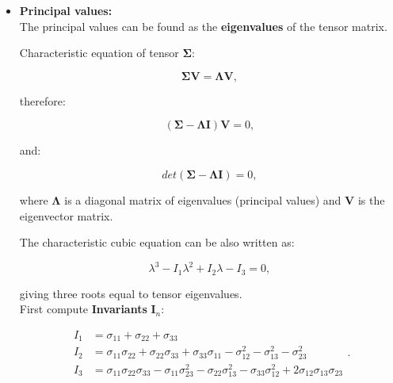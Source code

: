 \documentclass[10pt,b5paper,titlepage]{book}
\begin{document}
\begin{itemize}
    \item \textbf{Principal values:} \\

        The principal values can be found as the \textbf{eigenvalues} of the tensor
        matrix.

        Characteristic equation of tensor $\mathbf{\Sigma}$:

        \begin{equation}
            \mathbf{\Sigma}\mathbf{V} = \mathbf{\Lambda} \mathbf{V}
        ,\end{equation}

        therefore:

        \begin{equation}
            (\mathbf{\Sigma} - \mathbf{\Lambda}\mathbf{I})\mathbf{V} = 0
        ,\end{equation}

        and:

        \begin{equation}
            det(\mathbf{\Sigma} - \mathbf{\Lambda}\mathbf{I}) = 0
        ,\end{equation}

        where $\mathbf{\Lambda}$ is a diagonal matrix of eigenvalues (principal values)
        and $\mathbf{V}$ is the eigenvector matrix.

        The characteristic cubic equation can be also written as:

        \begin{equation}
            \lambda^{3} - I_{1}\lambda^{2} + I_{2}\lambda - I_{3} = 0
        ,\end{equation}

        giving three roots equal to tensor eigenvalues.\\

        First compute \textbf{Invariants} $\mathbf{I}_{n}$:

        \begin{equation}
            \begin{array}{ll}
                I_{1} &= \sigma_{11} + \sigma_{22} + \sigma_{33} \\
                I_{2} &= \sigma_{11}\sigma_{22} + \sigma_{22}\sigma_{33}
                + \sigma_{33}\sigma_{11} - \sigma_{12}^{2} - \sigma_{13}^{2} - \sigma_{23}^{2} \\
                I_{3}
                &= \sigma_{11}\sigma_{22}\sigma_{33}
                - \sigma_{11}\sigma_{23}^{2}
                - \sigma_{22}\sigma_{13}^{2}
                - \sigma_{33}\sigma_{12}^{2}
                + 2 \sigma_{12}\sigma_{13}\sigma_{23}
            \end{array}
        .\end{equation}


\end{itemize}
\end{document}
